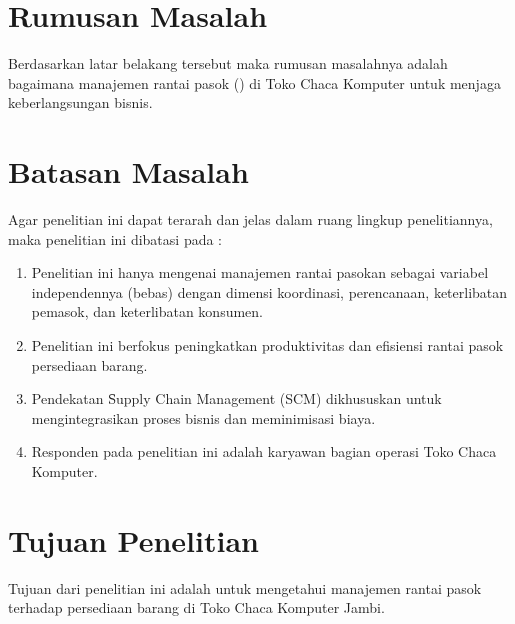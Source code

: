 \section{Rumusan Masalah}
Berdasarkan latar belakang tersebut maka rumusan masalahnya adalah bagaimana
manajemen rantai pasok (\SCM) di Toko Chaca Komputer untuk menjaga keberlangsungan bisnis.

\section{Batasan Masalah}
Agar penelitian ini dapat terarah dan jelas dalam ruang lingkup penelitiannya, maka penelitian ini dibatasi pada :
\begin{enumerate}
	\item Penelitian ini hanya mengenai manajemen rantai pasokan sebagai variabel independennya (bebas) dengan dimensi koordinasi, perencanaan, keterlibatan pemasok, dan keterlibatan konsumen.
	
	\item Penelitian ini berfokus peningkatkan produktivitas dan efisiensi rantai pasok persediaan barang.
	
	\item Pendekatan \f{Supply Chain Management} (SCM) dikhususkan untuk mengintegrasikan proses bisnis dan meminimisasi biaya.
	
	\item Responden pada penelitian ini adalah karyawan bagian operasi Toko Chaca Komputer. 
\end{enumerate}


\section{Tujuan Penelitian}
Tujuan dari penelitian ini adalah untuk mengetahui manajemen rantai pasok terhadap persediaan barang di Toko Chaca Komputer Jambi.


